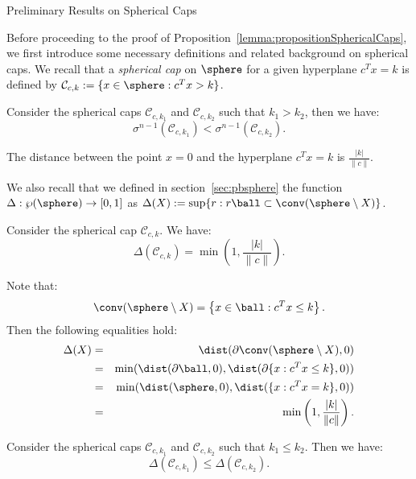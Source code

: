 \begin{section}{Preliminary Results on Spherical Caps}\label{sec:app_prelim_caps}

Before proceeding to the proof of Proposition~\ref{lemma:propositionSphericalCaps}, we first introduce some necessary definitions and related background on spherical caps. We recall that a \emph{spherical cap} on $\sphere$ for a given hyperplane $c^Tx = k$ is defined by $\mathcal{C}_{c,k} := \{x \in \sphere : c^Tx >k\}$.


\begin{rem}\label{lemma:muMonotone}
Consider the spherical caps $\mathcal{C}_{c, k_1}$ and $\mathcal{C}_{c, k_2}$ such that $k_1 > k_2$, then we have:
$$\sigma^{n-1}(\mathcal{C}_{c,k_1}) < \sigma^{n-1}(\mathcal{C}_{c,k_2}).$$
\end{rem}


\begin{rem}\label{prop:distance}
The distance between the point $x=0$ and the hyperplane $c^Tx = k$ is $\frac{|k|}{\|c\|}$.
\end{rem}

We also recall that we defined in section~\ref{sec:pbsphere} the function $\Delta: \wp(\sphere) \to [0,1]$ as $\Delta(X) := \sup \{r: r\ball \subset \conv(\sphere \setminus X)\}$.


\begin{lem} \label{lemma:delta2} 
Consider the spherical cap $\mathcal{C}_{c,k}$. We have:
$$\Delta(\mathcal{C}_{c,k}) = \min\left(1, \frac{|k|}{\|c\|}\right).$$
\end{lem}

\begin{pf}
Note that: $$\conv(\sphere \setminus X)= \left\{x \in \ball : c^Tx \leq k \right\}.$$
Then the following equalities hold:
\begin{eqnarray}
\nonumber \Delta(X) &=& \dist(\partial \conv(\sphere \setminus X), 0) \\
\nonumber &=& \min(\dist(\partial \ball, 0), \dist(\partial\{x : c^Tx \leq k\}, 0)) \\
\nonumber &=& \min(\dist(\sphere, 0), \dist(\{x : c^Tx = k\}, 0)) \\
\nonumber &=& \min\left(1, \frac{|k|}{\|c\|}\right).
\end{eqnarray}
\end{pf}

\begin{cor}\label{lemma:deltaMonotone} 
Consider the spherical caps $\mathcal{C}_{c, k_1}$ and $\mathcal{C}_{c, k_2}$ such that $k_1 \leq k_2$. Then we have: $$\Delta(\mathcal{C}_{c,k_1}) \leq \Delta(\mathcal{C}_{c,k_2}).$$
\end{cor}


\end{section}
